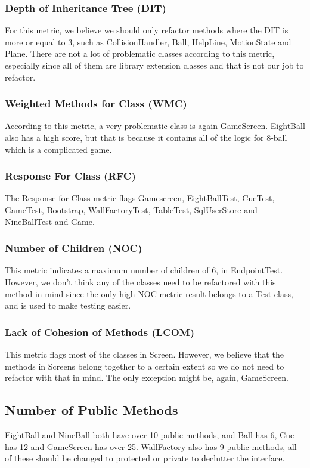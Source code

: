 \documentclass{article}
\begin{document}
\subsubsection{Depth of Inheritance Tree (DIT)}
For this metric, we believe we should only refactor methods where the DIT is more or equal to 3, such as CollisionHandler, Ball, HelpLine, MotionState and Plane. There are not a lot of problematic classes according to this metric, especially since all of them are library extension classes and that is not our job to refactor.

\subsubsection{Weighted Methods for Class (WMC)}
According to this metric, a very problematic class is again GameScreen. EightBall also has a high score, but that is because it contains all of the logic for 8-ball which is a complicated game.

\subsubsection{Response For Class (RFC)}
The Response for Class metric flags Gamescreen, EightBallTest, CueTest, GameTest, Bootstrap, WallFactoryTest, TableTest, SqlUserStore and NineBallTest and Game.

\subsubsection{Number of Children (NOC)}
This metric indicates a maximum number of children of 6, in EndpointTest. However, we don't think any of the classes need to be refactored with this method in mind since the only high NOC metric result belongs to a Test class, and is used to make testing easier.

\subsubsection{Lack of Cohesion of Methods (LCOM)}
This metric flags most of the classes in Screen. However, we believe that the methods in Screens belong together to a certain extent so we do not need to refactor with that in mind. The only exception might be, again, GameScreen.

\subsection{Number of Public Methods}
EightBall and NineBall both have over 10 public methods, and Ball has 6, Cue has 12 and GameScreen has over 25. WallFactory also has 9 public methods, all of these should be changed to protected or private to declutter the interface. 
\end{document}
